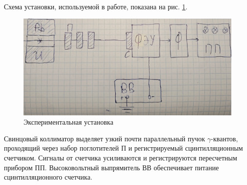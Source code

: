 	Схема установки, используемой в работе, показана на рис. \ref{WeakCoeff_Scheme}.
	\begin{figure}[h!]
		\centering
		\includegraphics[width=0.8\linewidth]{Pictures/Scheme}
		\caption{Экспериментальная установка}
		\label{WeakCoeff_Scheme}
	\end{figure}
	Свинцовый коллиматор выделяет узкий почти параллельный пучок $\gamma$-квантов, проходящий через набор поглотителей П и регистрируемый сцинтилляционным счетчиком. Сигналы от счетчика усиливаются и регистрируются пересчетным прибором ПП. Высоковольтный выпрямитель ВВ обеспечивает питание сцинтилляционного счетчика.

	
	
